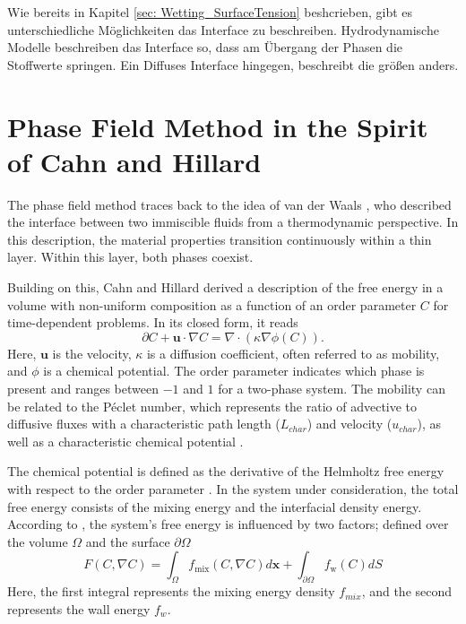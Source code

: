 
Wie bereits in Kapitel \ref{sec: Wetting_SurfaceTension} beshcrieben, gibt es unterschiedliche Möglichkeiten das Interface zu beschreiben. Hydrodynamische Modelle beschreiben das Interface so, dass am Übergang der Phasen die Stoffwerte springen. Ein Diffuses Interface hingegen, beschreibt die größen anders. 

\section{Phase Field Method in the Spirit of Cahn and Hillard}
The phase field method traces back to the idea of van der Waals \cite{vanderwaals1979ThermodynamicTheoryCapillarity}, who described the interface between two immiscible fluids from a thermodynamic perspective. In this description, the material properties transition continuously within a thin layer. Within this layer, both phases coexist.

Building on this, Cahn and Hillard \cite{johnw.FreeEnergyNonuniform1958} derived a description of the free energy in a volume with non-uniform composition as a function of an order parameter $C$ for time-dependent problems. In its closed form, it reads
\begin{equation}
\label{eq: CahnHillard}
    \partial C + \textbf{u} \cdot \nabla C = \nabla \cdot \left(\kappa \nabla \phi(C)\right).
\end{equation}
Here, $\textbf{u}$ is the velocity, $\kappa$ is a diffusion coefficient, often referred to as mobility, and $\phi$ is a chemical potential. The order parameter indicates which phase is present and ranges between $-1$ and $1$ for a two-phase system. The mobility can be related to the Péclet number, which represents the ratio of advective to diffusive fluxes with a characteristic path length ($L_{char}$) and velocity ($u_{char}$), as well as a characteristic chemical potential \cite{cai2015NumericalSimulationWetting,holzinger2021DirectNumericalSimulation}.

The chemical potential is defined as the derivative of the Helmholtz free energy with respect to the order parameter \cite{johnw.FreeEnergyNonuniform1958}. In the system under consideration, the total free energy consists of the mixing energy and the interfacial density energy. According to \cite{yue2010SharpinterfaceLimitCahn}, the system's free energy is influenced by two factors; defined over the volume $\Omega$ and the surface $\partial\Omega$ 
\begin{equation}
    F(C, \nabla C) = \int_{\Omega} f_{\mathrm{mix}} (C, \nabla C) d\textbf{x}+ \int_{\partial\Omega}f_\mathrm{w}(C) dS
\end{equation}
Here, the first integral represents the mixing energy density $f_{mix}$, and the second represents the wall energy $f_w$.



